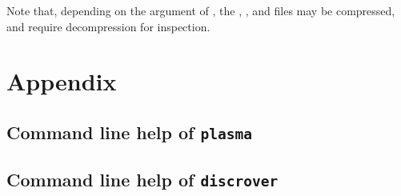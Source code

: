 \documentclass[a4paper]{article}
\newcommand{\plasma}[0]{\texttt{plasma}}
\newcommand{\discrover}[0]{\texttt{discrover}}
\begin{document}
Note that, depending on the argument of , the , , and  files may be compressed, and require decompression for inspection.


\section{Appendix}
\subsection{Command line help of \plasma{}}
\label{appendix:plasma-cli-help}
{%
  \footnotesize
  
}

\subsection{Command line help of \discrover{}}
\label{appendix:discrover-cli-help}
{%
  \footnotesize
  
}



\nocite{*}
{}


\end{document}
